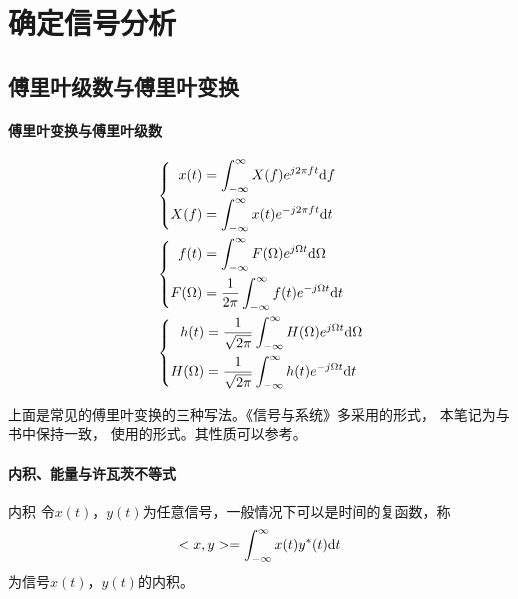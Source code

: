 \section{确定信号分析}\label{chapter:II}
\subsection{傅里叶级数与傅里叶变换}
        \paragraph{傅里叶变换与傅里叶级数}\mbox{}

    \begin{align}
        &\left\{ \begin{aligned}
            x(t) &=\int_{-\infty}^{\infty}X(f)e^{j2\pi ft}\text{\upshape d} f\\
            X(f) &=\int_{-\infty}^{\infty}x(t)e^{-j2\pi ft}\text{\upshape d} t
        \end{aligned} \right.\label{eq:ft_f}\\
        &\left\{ \begin{aligned}
            f(t) &=\int_{-\infty}^{\infty}F(\Omega)e^{j\Omega t}\text{\upshape d} \Omega\\
            F(\Omega) &=\frac{1}{2\pi}\int_{-\infty}^{\infty}f(t)e^{-j\Omega t}\text{\upshape d} t
        \end{aligned} \right.\label{eq:ft_omega}\\
        &\left\{ \begin{aligned}
            h(t) &=\frac{1}{\sqrt{2\pi}}\int_{-\infty}^{\infty}H(\Omega)e^{j\Omega t}\text{\upshape d} \Omega\\
            H(\Omega) &=\frac{1}{\sqrt{2\pi}}\int_{-\infty}^{\infty}h(t)e^{-j\Omega t}\text{\upshape d} t
        \end{aligned} \right.
    \end{align}

    上面是常见的傅里叶变换的三种写法。《信号与系统》多采用的形式，
    本笔记为与书中保持一致，
    使用的形式。其性质可以参考。

    \paragraph{内积、能量与许瓦茨不等式}\mbox{}

    \begin{mydef}{内积}\label{def:inner}
        令$x(t)$，$y(t)$为任意信号，一般情况下可以是时间的复函数，称
        \begin{equation}
            <x,y>=\int_{-\infty}^{\infty}x(t)y^*(t)\text{\upshape d} t
        \end{equation}
        为信号$x(t)$，$y(t)$的内积。
    \end{mydef}
    
